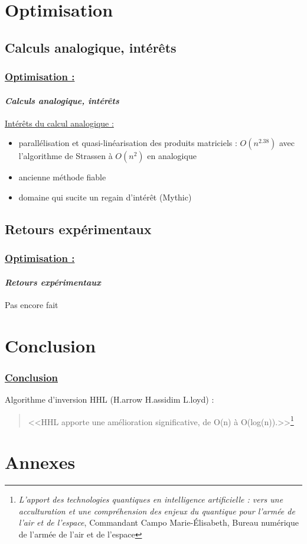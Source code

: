 \documentclass[10pt]{beamer}
\begin{document}
	\section{Optimisation}
	\subsection{Calculs analogique, int\'er\^ets}
	\begin{frame}
		\frametitle{\uline{Optimisation :}}
		\framesubtitle{\textit{Calculs analogique, int\'er\^ets}}
		\uline{Int\'er\^ets du calcul analogique :}
		\begin{itemize}
			\item parall\'elisation et quasi-linéarisation des produits matriciels : $O(n^{2.38})$ avec l'algorithme de Strassen à $O(n^2)$ en analogique
			\item ancienne m\'ethode fiable
			\item domaine qui sucite un regain d'int\'er\^et (Mythic)
		\end{itemize}
	\end{frame}
	\subsection{Retours exp\'erimentaux}
	\begin{frame}
		\frametitle{\uline{Optimisation :}}
		\framesubtitle{\textit{Retours exp\'erimentaux}}
		Pas encore fait
	\end{frame}
	
	\section{Conclusion}
	\begin{frame}
		\frametitle{\uline{Conclusion}}
		\centering
  		\vfill
		Algorithme d'inversion HHL (H.arrow H.assidim L.loyd) :
		\begin{quote}
			<<HHL apporte une amélioration significative, de O(n) à O(log(n)).>>\footnote{\textit{L’apport des technologies quantiques en intelligence artificielle : vers une acculturation et une compr\'ehension des enjeux du quantique pour l’arm\'ee de l’air et de l’espace}, Commandant Campo Marie-\'Elisabeth, Bureau num\'erique de l’arm\'ee de l’air et de l’espace}
		\end{quote}
	\end{frame}
	
	\section{Annexes}
\end{document}
